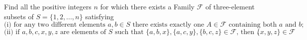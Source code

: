 Find all the positive integers $n$ for  which there exists a Family $\mathcal{F}$ of three-element subsets of $S=\{1,2,...,n\}$ satisfying
\[\text{(i) for any two different  elements $a,b \in S$ there exists exactly one $A \in \mathcal{F}$ containing both $a$ and $b$;}\]\[\text{(ii) if $a,b,c,x,y,z$ are elements of $S$ such that $\{a,b,x\},\{a,c,y\},\{b,c,z\} \in \mathcal{F}$, then $\{x,y,z\} \in \mathcal{F} $  }.\]